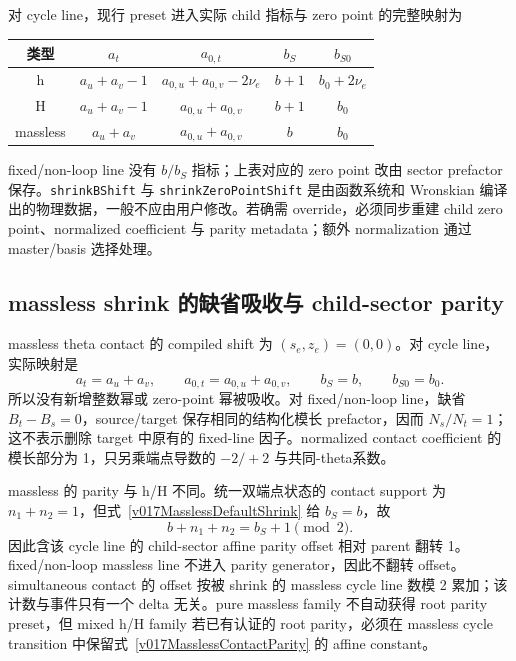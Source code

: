 ﻿\documentclass[a4paper,11pt]{article}
\begin{document}
对 cycle line，现行 preset 进入实际 child 指标与 zero point 的完整映射为
\begin{center}
\small
\begin{tabular}{c|c|c|c|c}
 类型 & $a_t$ & $a_{0,t}$ & $b_S$ & $b_{S0}$\\ \hline
 h & $a_u+a_v-1$ & $a_{0,u}+a_{0,v}-2\nu_e$ & $b+1$ & $b_0+2\nu_e$\\
 H & $a_u+a_v-1$ & $a_{0,u}+a_{0,v}$ & $b+1$ & $b_0$\\
 massless & $a_u+a_v$ & $a_{0,u}+a_{0,v}$ & $b$ & $b_0$
\end{tabular}
\end{center}
fixed/non-loop line 没有 $b/b_S$ 指标；上表对应的 zero point 改由 sector prefactor 保存。\texttt{shrinkBShift} 与 \texttt{shrinkZeroPointShift} 是由函数系统和 Wronskian 编译出的物理数据，一般不应由用户修改。若确需 override，必须同步重建 child zero point、normalized coefficient 与 parity metadata；额外 normalization 通过 master/basis 选择处理。

\subsection{massless shrink 的缺省吸收与 child-sector parity}

massless theta contact 的 compiled shift 为 $(s_e,z_e)=(0,0)$。对 cycle line，实际映射是
\begin{equation}
 a_t=a_u+a_v,\qquad a_{0,t}=a_{0,u}+a_{0,v},\qquad
 b_S=b,\qquad b_{S0}=b_0.
 \label{v017MasslessDefaultShrink}
\end{equation}
所以没有新增整数幂或 zero-point 幂被吸收。对 fixed/non-loop line，缺省 $B_t-B_s=0$，source/target 保存相同的结构化模长 prefactor，因而 $N_s/N_t=1$；这不表示删除 target 中原有的 fixed-line 因子。normalized contact coefficient 的模长部分为 1，只另乘端点导数的 $-2/+2$ 与共同-theta系数。

massless 的 parity 与 h/H 不同。统一双端点状态的 contact support 为 $n_1+n_2=1$，但式~\eqref{v017MasslessDefaultShrink} 给 $b_S=b$，故
\begin{equation}
 b+n_1+n_2=b_S+1\pmod 2.
 \label{v017MasslessContactParity}
\end{equation}
因此含该 cycle line 的 child-sector affine parity offset 相对 parent 翻转 1。fixed/non-loop massless line 不进入 parity generator，因此不翻转 offset。simultaneous contact 的 offset 按被 shrink 的 massless cycle line 数模 2 累加；该计数与事件只有一个 delta 无关。pure massless family 不自动获得 root parity preset，但 mixed h/H family 若已有认证的 root parity，必须在 massless cycle transition 中保留式~\eqref{v017MasslessContactParity} 的 affine constant。
\end{document}
